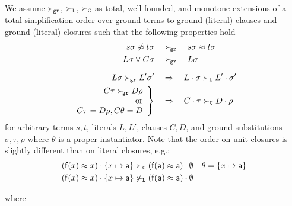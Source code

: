 \begin{definition}

    We assume \(\mathrel\succ_{\!\mathtt{gr}}\), \(\mathrel\succ_{\mathtt{L}}\), \(\mathrel\succ_{\mathtt{C}}\) as
        total, well-founded, and monotone extensions of a
        total simplification order over ground terms to ground (literal) clauses
        and ground (literal) closures such that the following properties hold
        \begin{align*}
            s\sigma\not\approx t\sigma \quad&\mathrel\succ_{\!\mathtt{gr}}\quad s\sigma\approx t\sigma
            \\
            L\sigma\lor C\sigma \quad&\mathrel\succ_{\!\mathtt{gr}}\quad L\sigma
            \\[0.7em]
            L\sigma \mathrel\succ_{\!\mathtt{gr}} L'\sigma'
            \quad&\Rightarrow\quad
            L\cdot\sigma \mathrel\succ_{\mathtt{L}} L'\cdot\sigma'
        \\
        \left.
        \begin{array}{r}
            C\tau\mathrel\succ_{\!\mathtt{gr}} D\rho\\
            \text{ or}
            \\
            C\tau=D\rho, C\theta=D
        \end{array}
        \right\}
            \quad&\Rightarrow\quad
            C\cdot\tau\mathrel\succ_{\mathtt{C}} D\cdot\rho
        \end{align*}
        for arbitrary terms \(s,t\),
        literals \(L, L'\),
        clauses \(C,D\), and
        ground substitutions \(\sigma, \tau, \rho\)
        where \(\theta\) is a proper instantiator.
        Note that the order on unit closures is slightly different than on literal closures, e.g.:
        \begin{align*}
            (\mathsf{f}(x)\approx x)\cdot\{ x\mapsto \mathsf{a}\}
            &\mathrel\succ_{\mathtt{C}}
            (\mathsf{f}(\mathsf{a})\approx\mathsf{a})\cdot\emptyset
            & \theta = \{ x\mapsto \mathsf{a} \}
        \\
        (\mathsf{f}(x)\approx x)\cdot\{ x\mapsto \mathsf{a}\}
        &\not\mathrel\succ_{\mathtt{L}}
        (\mathsf{f}(\mathsf{a})\approx\mathsf{a})\cdot\emptyset
        \end{align*}



\end{definition}

\begin{definition}
    
    where
    
    \end{definition}

